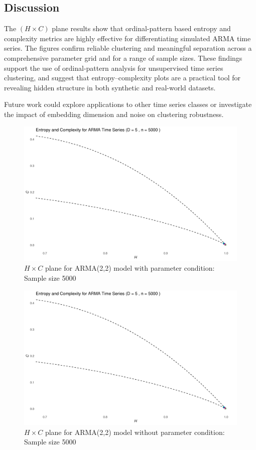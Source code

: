 \documentclass[12pt,a4paper]{article}
\begin{document}
\subsection{Discussion}

The $(H \times C)$ plane results show that ordinal-pattern based entropy and complexity metrics are highly effective for differentiating simulated ARMA time series. The figures confirm reliable clustering and meaningful separation across a comprehensive parameter grid and for a range of sample sizes. These findings support the use of ordinal-pattern analysis for unsupervised time series clustering, and suggest that entropy–complexity plots are a practical tool for revealing hidden structure in both synthetic and real-world datasets.

Future work could explore applications to other time series classes or investigate the impact of embedding dimension and noise on clustering robustness.


\begin{figure}[H]
	\includegraphics[width=0.8 \textwidth]{HC plane ARMA(22) n5000}
	\caption{$H \times C$ plane for ARMA(2,2) model with parameter condition: Sample size 5000}
	\label{fig:HC ARMA(22) constraint}
\end{figure}	

\begin{figure}[H]
	\includegraphics[width=0.8 \textwidth]{HC plane ARMA(22) n5000 without condition}
	\caption{$H \times C$ plane for ARMA(2,2) model without parameter condition: Sample size 5000}
	\label{fig:HC ARMA(22) unconstraint}
\end{figure}
\end{document}
